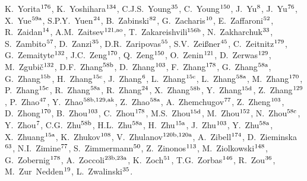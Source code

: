 \begin{flushleft}
K.~Yorita$^\textrm{\scriptsize 176}$,    
K.~Yoshihara$^\textrm{\scriptsize 134}$,    
C.J.S.~Young$^\textrm{\scriptsize 35}$,    
C.~Young$^\textrm{\scriptsize 150}$,    
J.~Yu$^\textrm{\scriptsize 8}$,    
J.~Yu$^\textrm{\scriptsize 76}$,    
X.~Yue$^\textrm{\scriptsize 59a}$,    
S.P.Y.~Yuen$^\textrm{\scriptsize 24}$,    
B.~Zabinski$^\textrm{\scriptsize 82}$,    
G.~Zacharis$^\textrm{\scriptsize 10}$,    
E.~Zaffaroni$^\textrm{\scriptsize 52}$,    
R.~Zaidan$^\textrm{\scriptsize 14}$,    
A.M.~Zaitsev$^\textrm{\scriptsize 121,ao}$,    
T.~Zakareishvili$^\textrm{\scriptsize 156b}$,    
N.~Zakharchuk$^\textrm{\scriptsize 33}$,    
S.~Zambito$^\textrm{\scriptsize 57}$,    
D.~Zanzi$^\textrm{\scriptsize 35}$,    
D.R.~Zaripovas$^\textrm{\scriptsize 55}$,    
S.V.~Zei{\ss}ner$^\textrm{\scriptsize 45}$,    
C.~Zeitnitz$^\textrm{\scriptsize 179}$,    
G.~Zemaityte$^\textrm{\scriptsize 132}$,    
J.C.~Zeng$^\textrm{\scriptsize 170}$,    
Q.~Zeng$^\textrm{\scriptsize 150}$,    
O.~Zenin$^\textrm{\scriptsize 121}$,    
D.~Zerwas$^\textrm{\scriptsize 129}$,    
M.~Zgubi\v{c}$^\textrm{\scriptsize 132}$,    
D.F.~Zhang$^\textrm{\scriptsize 58b}$,    
D.~Zhang$^\textrm{\scriptsize 103}$,    
F.~Zhang$^\textrm{\scriptsize 178}$,    
G.~Zhang$^\textrm{\scriptsize 58a}$,    
G.~Zhang$^\textrm{\scriptsize 15b}$,    
H.~Zhang$^\textrm{\scriptsize 15c}$,    
J.~Zhang$^\textrm{\scriptsize 6}$,    
L.~Zhang$^\textrm{\scriptsize 15c}$,    
L.~Zhang$^\textrm{\scriptsize 58a}$,    
M.~Zhang$^\textrm{\scriptsize 170}$,    
P.~Zhang$^\textrm{\scriptsize 15c}$,    
R.~Zhang$^\textrm{\scriptsize 58a}$,    
R.~Zhang$^\textrm{\scriptsize 24}$,    
X.~Zhang$^\textrm{\scriptsize 58b}$,    
Y.~Zhang$^\textrm{\scriptsize 15d}$,    
Z.~Zhang$^\textrm{\scriptsize 129}$,    
P.~Zhao$^\textrm{\scriptsize 47}$,    
Y.~Zhao$^\textrm{\scriptsize 58b,129,ak}$,    
Z.~Zhao$^\textrm{\scriptsize 58a}$,    
A.~Zhemchugov$^\textrm{\scriptsize 77}$,    
Z.~Zheng$^\textrm{\scriptsize 103}$,    
D.~Zhong$^\textrm{\scriptsize 170}$,    
B.~Zhou$^\textrm{\scriptsize 103}$,    
C.~Zhou$^\textrm{\scriptsize 178}$,    
M.S.~Zhou$^\textrm{\scriptsize 15d}$,    
M.~Zhou$^\textrm{\scriptsize 152}$,    
N.~Zhou$^\textrm{\scriptsize 58c}$,    
Y.~Zhou$^\textrm{\scriptsize 7}$,    
C.G.~Zhu$^\textrm{\scriptsize 58b}$,    
H.L.~Zhu$^\textrm{\scriptsize 58a}$,    
H.~Zhu$^\textrm{\scriptsize 15a}$,    
J.~Zhu$^\textrm{\scriptsize 103}$,    
Y.~Zhu$^\textrm{\scriptsize 58a}$,    
X.~Zhuang$^\textrm{\scriptsize 15a}$,    
K.~Zhukov$^\textrm{\scriptsize 108}$,    
V.~Zhulanov$^\textrm{\scriptsize 120b,120a}$,    
A.~Zibell$^\textrm{\scriptsize 174}$,    
D.~Zieminska$^\textrm{\scriptsize 63}$,    
N.I.~Zimine$^\textrm{\scriptsize 77}$,    
S.~Zimmermann$^\textrm{\scriptsize 50}$,    
Z.~Zinonos$^\textrm{\scriptsize 113}$,    
M.~Ziolkowski$^\textrm{\scriptsize 148}$,    
G.~Zobernig$^\textrm{\scriptsize 178}$,    
A.~Zoccoli$^\textrm{\scriptsize 23b,23a}$,    
K.~Zoch$^\textrm{\scriptsize 51}$,    
T.G.~Zorbas$^\textrm{\scriptsize 146}$,    
R.~Zou$^\textrm{\scriptsize 36}$,    
M.~Zur~Nedden$^\textrm{\scriptsize 19}$,    
L.~Zwalinski$^\textrm{\scriptsize 35}$.    
\bigskip
\\


\end{flushleft}
